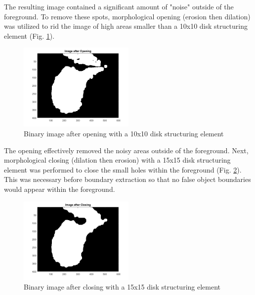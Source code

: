 \documentclass{article}[12 pt]
\begin{document}
\noindent 
The resulting image contained a significant amount of "noise" outside of the foreground.  To remove these spots, morphological opening (erosion then dilation) was utilized to rid the image of high areas smaller than a 10x10 disk structuring element (Fig. \ref{openedImage}).

\begin{center}
	\begin{figure}[H]
		\centering
		\includegraphics[width = 0.5\textwidth]{Images/openedImage.png}
		\caption{Binary image after opening with a 10x10 disk structuring element}
		\label{openedImage}
	\end{figure}
\end{center}

\noindent
The opening effectively removed the noisy areas outside of the foreground.  Next, morphological closing (dilation then erosion) with a 15x15 disk structuring element was performed to close the small holes within the foreground (Fig. \ref{closedImage}).  This was necessary before boundary extraction so that no false object boundaries would appear within the foreground.

\begin{center}
	\begin{figure}[H]
		\centering
		\includegraphics[width = 0.5\textwidth]{Images/closedImage.png}
		\caption{Binary image after closing with a 15x15 disk structuring element}
		\label{closedImage}
	\end{figure}
\end{center}
\end{document}
